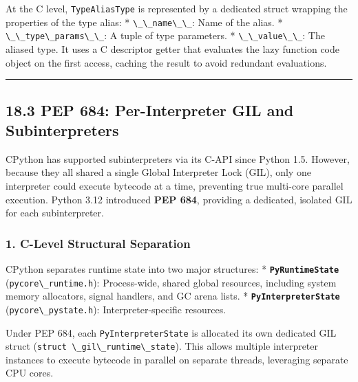 At the C level, \passthrough{\lstinline!TypeAliasType!} is represented
by a dedicated struct wrapping the properties of the type alias: *
\passthrough{\lstinline!\_\_name\_\_!}: Name of the alias. *
\passthrough{\lstinline!\_\_type\_params\_\_!}: A tuple of type
parameters. * \passthrough{\lstinline!\_\_value\_\_!}: The aliased type.
It uses a C descriptor getter that evaluates the lazy function code
object on the first access, caching the result to avoid redundant
evaluations.

\begin{center}\rule{0.5\linewidth}{0.5pt}\end{center}

\hypertarget{pep-684-per-interpreter-gil-and-subinterpreters}{%
\subsection{18.3 PEP 684: Per-Interpreter GIL and
Subinterpreters}\label{pep-684-per-interpreter-gil-and-subinterpreters}}

CPython has supported subinterpreters via its C-API since Python 1.5.
However, because they all shared a single Global Interpreter Lock (GIL),
only one interpreter could execute bytecode at a time, preventing true
multi-core parallel execution. Python 3.12 introduced \textbf{PEP 684},
providing a dedicated, isolated GIL for each subinterpreter.

\hypertarget{c-level-structural-separation}{%
\subsubsection{1. C-Level Structural
Separation}\label{c-level-structural-separation}}

CPython separates runtime state into two major structures: *
\textbf{\passthrough{\lstinline!PyRuntimeState!}}
(\passthrough{\lstinline!pycore\_runtime.h!}): Process-wide, shared
global resources, including system memory allocators, signal handlers,
and GC arena lists. *
\textbf{\passthrough{\lstinline!PyInterpreterState!}}
(\passthrough{\lstinline!pycore\_pystate.h!}): Interpreter-specific
resources.

Under PEP 684, each \passthrough{\lstinline!PyInterpreterState!} is
allocated its own dedicated GIL struct
(\passthrough{\lstinline!struct \_gil\_runtime\_state!}). This allows
multiple interpreter instances to execute bytecode in parallel on
separate threads, leveraging separate CPU cores.


